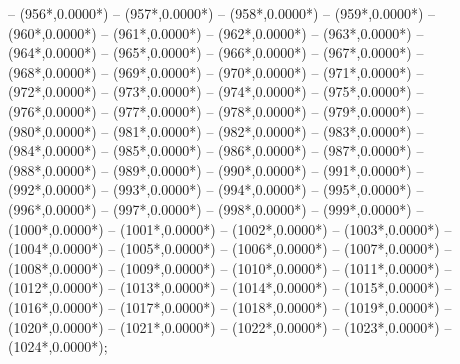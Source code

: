 {		-- ({956*\dx},{0.0000*\dy})
		-- ({957*\dx},{0.0000*\dy})
		-- ({958*\dx},{0.0000*\dy})
		-- ({959*\dx},{0.0000*\dy})
		-- ({960*\dx},{0.0000*\dy})
		-- ({961*\dx},{0.0000*\dy})
		-- ({962*\dx},{0.0000*\dy})
		-- ({963*\dx},{0.0000*\dy})
		-- ({964*\dx},{0.0000*\dy})
		-- ({965*\dx},{0.0000*\dy})
		-- ({966*\dx},{0.0000*\dy})
		-- ({967*\dx},{0.0000*\dy})
		-- ({968*\dx},{0.0000*\dy})
		-- ({969*\dx},{0.0000*\dy})
		-- ({970*\dx},{0.0000*\dy})
		-- ({971*\dx},{0.0000*\dy})
		-- ({972*\dx},{0.0000*\dy})
		-- ({973*\dx},{0.0000*\dy})
		-- ({974*\dx},{0.0000*\dy})
		-- ({975*\dx},{0.0000*\dy})
		-- ({976*\dx},{0.0000*\dy})
		-- ({977*\dx},{0.0000*\dy})
		-- ({978*\dx},{0.0000*\dy})
		-- ({979*\dx},{0.0000*\dy})
		-- ({980*\dx},{0.0000*\dy})
		-- ({981*\dx},{0.0000*\dy})
		-- ({982*\dx},{0.0000*\dy})
		-- ({983*\dx},{0.0000*\dy})
		-- ({984*\dx},{0.0000*\dy})
		-- ({985*\dx},{0.0000*\dy})
		-- ({986*\dx},{0.0000*\dy})
		-- ({987*\dx},{0.0000*\dy})
		-- ({988*\dx},{0.0000*\dy})
		-- ({989*\dx},{0.0000*\dy})
		-- ({990*\dx},{0.0000*\dy})
		-- ({991*\dx},{0.0000*\dy})
		-- ({992*\dx},{0.0000*\dy})
		-- ({993*\dx},{0.0000*\dy})
		-- ({994*\dx},{0.0000*\dy})
		-- ({995*\dx},{0.0000*\dy})
		-- ({996*\dx},{0.0000*\dy})
		-- ({997*\dx},{0.0000*\dy})
		-- ({998*\dx},{0.0000*\dy})
		-- ({999*\dx},{0.0000*\dy})
		-- ({1000*\dx},{0.0000*\dy})
		-- ({1001*\dx},{0.0000*\dy})
		-- ({1002*\dx},{0.0000*\dy})
		-- ({1003*\dx},{0.0000*\dy})
		-- ({1004*\dx},{0.0000*\dy})
		-- ({1005*\dx},{0.0000*\dy})
		-- ({1006*\dx},{0.0000*\dy})
		-- ({1007*\dx},{0.0000*\dy})
		-- ({1008*\dx},{0.0000*\dy})
		-- ({1009*\dx},{0.0000*\dy})
		-- ({1010*\dx},{0.0000*\dy})
		-- ({1011*\dx},{0.0000*\dy})
		-- ({1012*\dx},{0.0000*\dy})
		-- ({1013*\dx},{0.0000*\dy})
		-- ({1014*\dx},{0.0000*\dy})
		-- ({1015*\dx},{0.0000*\dy})
		-- ({1016*\dx},{0.0000*\dy})
		-- ({1017*\dx},{0.0000*\dy})
		-- ({1018*\dx},{0.0000*\dy})
		-- ({1019*\dx},{0.0000*\dy})
		-- ({1020*\dx},{0.0000*\dy})
		-- ({1021*\dx},{0.0000*\dy})
		-- ({1022*\dx},{0.0000*\dy})
		-- ({1023*\dx},{0.0000*\dy})
		-- ({1024*\dx},{0.0000*\dy});
	}
